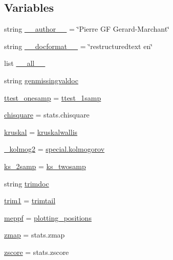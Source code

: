 \subsection*{Variables}
\begin{DoxyCompactItemize}
\item 
string \hyperlink{namespacescipy_1_1stats_1_1mstats__basic_a62fb8f5276cdd4f1703a2a3a299b13c6}{\+\_\+\+\_\+author\+\_\+\+\_\+} = \char`\"{}Pierre G\+F Gerard-\/Marchant\char`\"{}
\item 
string \hyperlink{namespacescipy_1_1stats_1_1mstats__basic_a35bde415e7bfea6c39454a2683edb258}{\+\_\+\+\_\+docformat\+\_\+\+\_\+} = \char`\"{}restructuredtext en\char`\"{}
\item 
list \hyperlink{namespacescipy_1_1stats_1_1mstats__basic_ae5a519977e74f95928e24b370e209114}{\+\_\+\+\_\+all\+\_\+\+\_\+}
\item 
string \hyperlink{namespacescipy_1_1stats_1_1mstats__basic_a6ec58bbd7fad669ea19fe669fa1b63c8}{genmissingvaldoc}
\item 
\hyperlink{namespacescipy_1_1stats_1_1mstats__basic_a218318dde3ea85dc216b2bb137b20418}{ttest\+\_\+onesamp} = \hyperlink{namespacescipy_1_1stats_1_1mstats__basic_a694110a4f8010c5fa5e00ab5e67862ee}{ttest\+\_\+1samp}
\item 
\hyperlink{namespacescipy_1_1stats_1_1mstats__basic_a3592d3c150c776d432ac152bd106a179}{chisquare} = stats.\+chisquare
\item 
\hyperlink{namespacescipy_1_1stats_1_1mstats__basic_a0328a0edece28c1872e7a78fdab7acdf}{kruskal} = \hyperlink{namespacescipy_1_1stats_1_1mstats__basic_a875c23dc169db21e4111b9113aea4fda}{kruskalwallis}
\item 
\hyperlink{namespacescipy_1_1stats_1_1mstats__basic_af22bcae794f65bb23ce9fc2819ce3647}{\+\_\+kolmog2} = \hyperlink{cephes_8h_a58adfca8396d843c0272c3965fd28b3c}{special.\+kolmogorov}
\item 
\hyperlink{namespacescipy_1_1stats_1_1mstats__basic_aa7ceaef85d56c33ee9e2e9fc567d9264}{ks\+\_\+2samp} = \hyperlink{namespacescipy_1_1stats_1_1mstats__basic_a81566a96ec62a3f846967f8df39284ae}{ks\+\_\+twosamp}
\item 
string \hyperlink{namespacescipy_1_1stats_1_1mstats__basic_ab56be8fb320bf19e91cd432103f00a9a}{trimdoc}
\item 
\hyperlink{namespacescipy_1_1stats_1_1mstats__basic_aac3b69572dcea667b4f86e1c1eab08d0}{trim1} = \hyperlink{namespacescipy_1_1stats_1_1mstats__basic_afe3901ec673ef822046e8c336a8a7dcc}{trimtail}
\item 
\hyperlink{namespacescipy_1_1stats_1_1mstats__basic_adfee174d544925de2b6d07ab86874643}{meppf} = \hyperlink{namespacescipy_1_1stats_1_1mstats__basic_aa521b298aa4dbc04d199c35d6fadaf32}{plotting\+\_\+positions}
\item 
\hyperlink{namespacescipy_1_1stats_1_1mstats__basic_a115175a8e28c378dcc3db2d7f2a3b72f}{zmap} = stats.\+zmap
\item 
\hyperlink{namespacescipy_1_1stats_1_1mstats__basic_ad6a3ef6da6c2b10650c0bad2dc6dd85d}{zscore} = stats.\+zscore
\end{DoxyCompactItemize}


